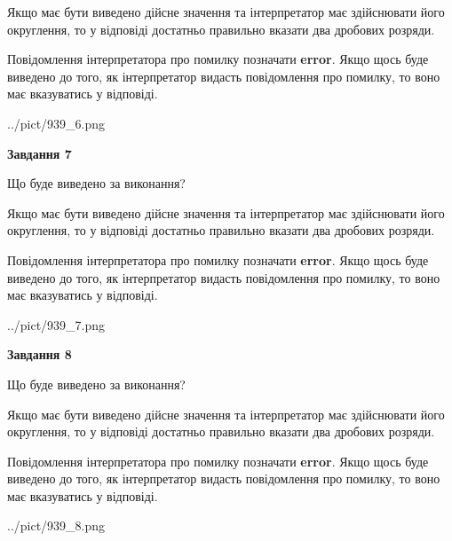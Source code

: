 \documentclass[12pt, ukrainian]{article}
\begin{document}
{\begin {Large}
Якщо має бути виведено дійсне значення та інтерпретатор має здійснювати його округлення, 
то у відповіді достатньо правильно вказати два дробових розряди.

Повідомлення інтерпретатора про помилку позначати \textbf{error}.
Якщо щось буде виведено до того, як інтерпретатор видасть повідомлення про помилку, 
то воно має вказуватись у відповіді. \par

\begin{center}
	{../pict/939_6.png}
\end{center}
\newpage

{\begin {center}\textbf{Завдання 7}\end {center}}\par
Що буде виведено за виконання? \par

Якщо має бути виведено дійсне значення та інтерпретатор має здійснювати його округлення, 
то у відповіді достатньо правильно вказати два дробових розряди.

Повідомлення інтерпретатора про помилку позначати \textbf{error}.
Якщо щось буде виведено до того, як інтерпретатор видасть повідомлення про помилку, 
то воно має вказуватись у відповіді. \par

\begin{center}
	{../pict/939_7.png}
\end{center}
\newpage

{\begin {center}\textbf{Завдання 8}\end {center}}\par
Що буде виведено за виконання? \par

Якщо має бути виведено дійсне значення та інтерпретатор має здійснювати його округлення, 
то у відповіді достатньо правильно вказати два дробових розряди.

Повідомлення інтерпретатора про помилку позначати \textbf{error}.
Якщо щось буде виведено до того, як інтерпретатор видасть повідомлення про помилку, 
то воно має вказуватись у відповіді. \par

\begin{center}
	{../pict/939_8.png}
\end{center}
\newpage


\end{Large}}
\end{document}
